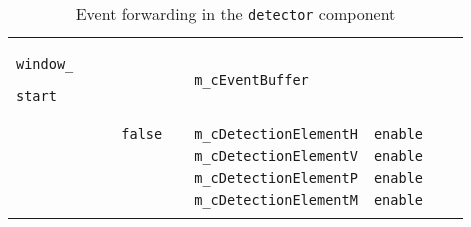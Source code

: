 \begin{footnotesize}
\begin{longtable}[H]{ | m{1.2cm} | m{1.9cm} | m{1.2cm} | l | m{1.5cm} || m{1.8cm} | m{1.4cm} | m{1.2cm} | m{1.7cm} | }
  \texttt{window\_} \par \texttt{start} &
  &
  &
  &
  &
  \texttt{m\_cEventBuffer} &
  &
  &
  \\
\cline{4-9}
  &
  &
  &
  \texttt{false} &
  &
  \texttt{m\_cDetectionElementH} &
  \texttt{enable} &
  &
  \\
\cline{6-9}
  &
  &
  &
  &
  &
  \texttt{m\_cDetectionElementV} &
  \texttt{enable} &
  &
  \\
\cline{6-9}
  &
  &
  &
  &
  &
  \texttt{m\_cDetectionElementP} &
  \texttt{enable} &
  &
  \\
\cline{6-9}
  &
  &
  &
  &
  &
  \texttt{m\_cDetectionElementM} &
  \texttt{enable} &
  &
  \\
\hline
\caption{Event forwarding in the \texttt{detector} component}
\label{tab:comp_detector_evfwd}
\end{longtable}
\end{footnotesize}

